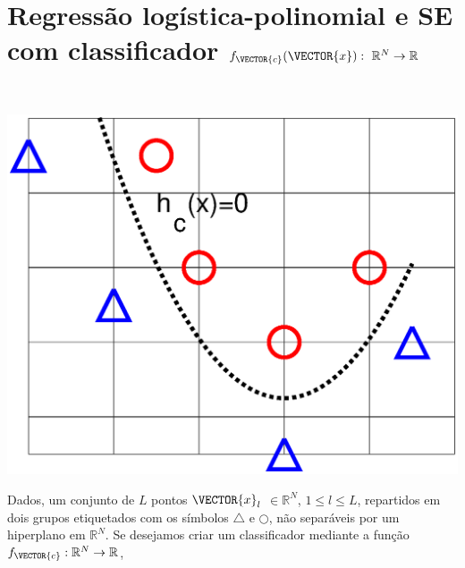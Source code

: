 \newpage

\section{Regressão logística-polinomial e SE com classificador $f_{\VECTOR{c}}(\VECTOR{x}):~\mathbb{R}^{N} \rightarrow \mathbb{R}$}


\begin{theorem}\label{theo:reglogrnr1poly:1}
~\\
\noindent
\begin{minipage}{0.45\textwidth}
\centering
\includegraphics[width=0.95\linewidth]{chapters/classificacao/mfiles/reglogrnr1poly/reglogrnr1poly.eps} 
\end{minipage}
\begin{minipage}{0.55\textwidth}
Dados, um conjunto de $L$ pontos
$\VECTOR{x}_l$ $\in \mathbb{R}^{N}$, $1\leq l \leq L$,
repartidos em dois grupos etiquetados com os símbolos $\bigtriangleup$ e $\bigcirc$,
não separáveis por um hiperplano  em $\mathbb{R}^{N}$.
Se desejamos criar um classificador mediante 
a função  $f_{\VECTOR{c}}:\mathbb{R}^{N} \rightarrow \mathbb{R}$,

\end{minipage}
\end{theorem}
